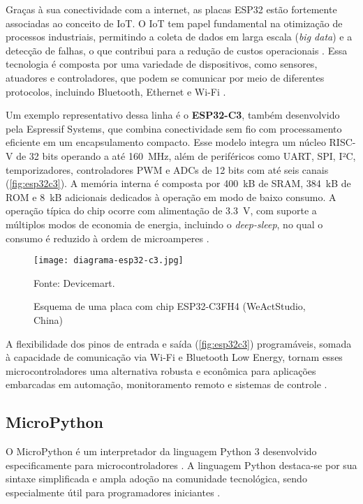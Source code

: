 Graças à sua conectividade com a internet, as placas ESP32 estão fortemente associadas ao conceito de IoT. O IoT tem papel fundamental na otimização de processos industriais, permitindo a coleta de dados em larga escala (\textit{big data}) e a detecção de falhas, o que contribui para a redução de custos operacionais \cite{ferencz2020rapid}. Essa tecnologia é composta por uma variedade de dispositivos, como sensores, atuadores e controladores, que podem se comunicar por meio de diferentes protocolos, incluindo Bluetooth, Ethernet e Wi-Fi \cite{shinde2017industrial}.

Um exemplo representativo dessa linha é o \textbf{ESP32-C3}, também desenvolvido pela Espressif Systems, que combina conectividade sem fio com processamento eficiente em um encapsulamento compacto. Esse modelo integra um núcleo RISC-V de 32 bits operando a até 160~MHz, além de periféricos como UART, SPI, I²C, temporizadores, controladores PWM e ADCs de 12 bits com até seis canais (\autoref{fig:esp32c3}). A memória interna é composta por 400~kB de SRAM, 384~kB de ROM e 8~kB adicionais dedicados à operação em modo de baixo consumo. A operação típica do chip ocorre com alimentação de 3.3~V, com suporte a múltiplos modos de economia de energia, incluindo o \textit{deep-sleep}, no qual o consumo é reduzido à ordem de microamperes \cite{espressif_esp32c3_2025}.

\begin{figure}[ht]
    \centering
    \caption{Esquema de uma placa com chip ESP32-C3FH4 (WeActStudio, China) }
    \label{fig:esp32c3}
    \texttt{[image: diagrama-esp32-c3.jpg]}

    {\centering\footnotesize Fonte: Devicemart.\par}
\end{figure}

A flexibilidade dos pinos de entrada e saída (\autoref{fig:esp32c3}) programáveis, somada à capacidade de comunicação via Wi-Fi e Bluetooth Low Energy, tornam esses microcontroladores uma alternativa robusta e econômica para aplicações embarcadas em automação, monitoramento remoto e sistemas de controle \cite{espressif_esp32c3_2025}.


\subsection{MicroPython}

O MicroPython é um interpretador da linguagem Python 3 desenvolvido especificamente para microcontroladores \cite{PLAUSKA2022}. A linguagem Python destaca-se por sua sintaxe simplificada e ampla adoção na comunidade tecnológica, sendo especialmente útil para programadores iniciantes \cite{TOLLERVEY2017}.

